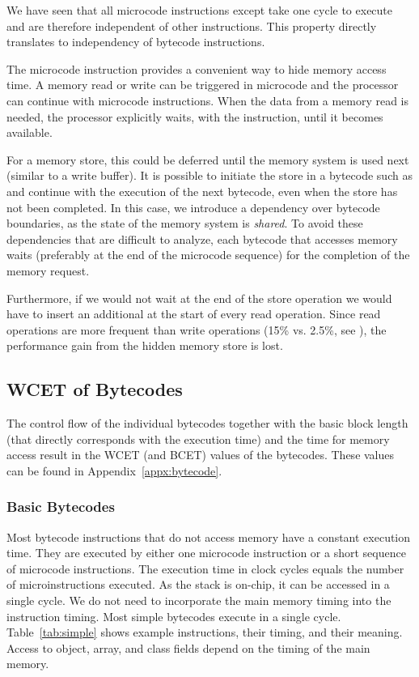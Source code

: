 We have seen that all microcode instructions except  take
one cycle to execute and are therefore independent of other
instructions. This property directly translates to independency of
bytecode instructions.

The  microcode instruction provides a convenient way to
hide memory access time. A memory read or write can be triggered in
microcode and the processor can continue with microcode
instructions. When the data from a memory read is needed, the
processor explicitly waits, with the  instruction, until
it becomes available.

For a memory store, this  could be deferred until the
memory system is used next (similar to a write buffer). It is
possible to initiate the store in a bytecode such as 
and continue with the execution of the next bytecode, even when the
store has not been completed. In this case, we introduce a
dependency over bytecode boundaries, as the state of the memory
system is \emph{shared}. To avoid these dependencies that are
difficult to analyze, each bytecode that accesses memory waits
(preferably at the end of the microcode sequence) for the completion
of the memory request.

Furthermore, if we would not wait at the end of the store operation
we would have to insert an additional  at the start of
every read operation. Since read operations are more frequent than
write operations (15\% vs. 2.5\%, see \cite{jop:thesis}), the
performance gain from the hidden memory store is lost.

\subsection{WCET of Bytecodes}
 

\label{sec:wcet:bc} The control flow of the individual bytecodes
together with the basic block length (that directly corresponds with
the execution time) and the time for memory access result in the WCET
(and BCET) values of the bytecodes. These values can be found in
Appendix~\ref{appx:bytecode}.

\subsubsection{Basic Bytecodes}

Most bytecode instructions that do not access memory have a constant
execution time. They are executed by either one microcode instruction
or a short sequence of microcode instructions. The execution time in
clock cycles equals the number of microinstructions executed. As the
stack is on-chip, it can be accessed in a single cycle. We do not
need to incorporate the main memory timing into the instruction
timing. Most simple bytecodes execute in a single cycle.
Table~\ref{tab:simple} shows example instructions, their timing, and
their meaning. Access to object, array, and class fields depend on
the timing of the main memory.

